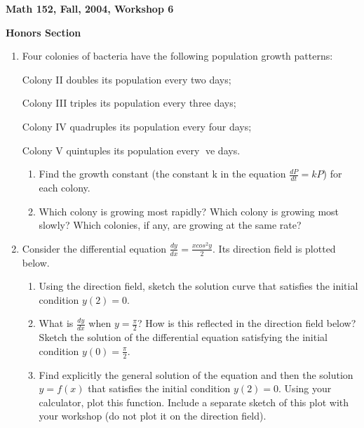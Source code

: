 \documentclass[12pt]{article}
\begin{document}
\begin{center}

{\large \bf Math 152, Fall, 2004, Workshop 6\par}
\vspace{.5cm}
{{\bf Honors Section} 
\par}
\end{center}

\begin{enumerate}

\item Four colonies of bacteria have the following 
population growth patterns: 

Colony II doubles its population every two days; 

Colony III triples its population every three days; 

Colony IV quadruples its population every four days; 

Colony V quintuples its population every ve days. 

\begin{enumerate}

\item Find the growth constant (the constant k in the equation 
$\frac{dP}{dt} 
= kP$) for each colony. 

\item Which colony is growing most rapidly? Which colony 
is growing most slowly? Which colonies, 
if any, are growing at the same rate? 

\end{enumerate}

\item Consider the differential equation $\frac{dy}{dx}
= \frac{x cos^{2}y}{2}$. Its direction field is plotted below. 

\begin{enumerate}

\item Using the direction field, sketch the solution curve that 
satisfies the initial condition $y(2) = 0$.

\item What is $\frac{dy}{dx}$
when $y = \frac{\pi}{2}$? How is this reflected in the direction 
field below? Sketch the 
solution of the differential equation satisfying the initial 
condition $y(0) = \frac{\pi}{2}$. 


\vspace{50em}



\item Find explicitly the general solution of the equation and 
then the solution $y = f(x)$ that satisfies 
the initial condition $y(2) = 0$. Using your calculator, plot this 
function. Include a separate sketch 
of this plot with your workshop (do not plot it on the direction field). 


\end{enumerate}
\end{enumerate}
\end{document}
